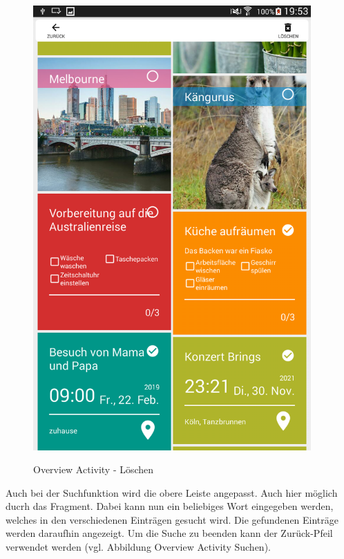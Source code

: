 \begin{figure}[H]
\centering
\begin{minipage}[t]{1\textwidth} %
\caption{Overview Activity - Löschen} %
\includegraphics[height=17cm]{img/Loeschen}\\ %
\end{minipage}
\end{figure}

Auch bei der Suchfunktion wird die obere Leiste angepasst. Auch hier möglich ducrh das Fragment. Dabei kann nun ein beliebiges Wort eingegeben werden, welches in den verschiedenen Einträgen gesucht wird. Die gefundenen Einträge werden daraufhin angezeigt. Um die Suche zu beenden kann der Zurück-Pfeil verwendet werden (vgl. Abbildung Overview Activity Suchen).

